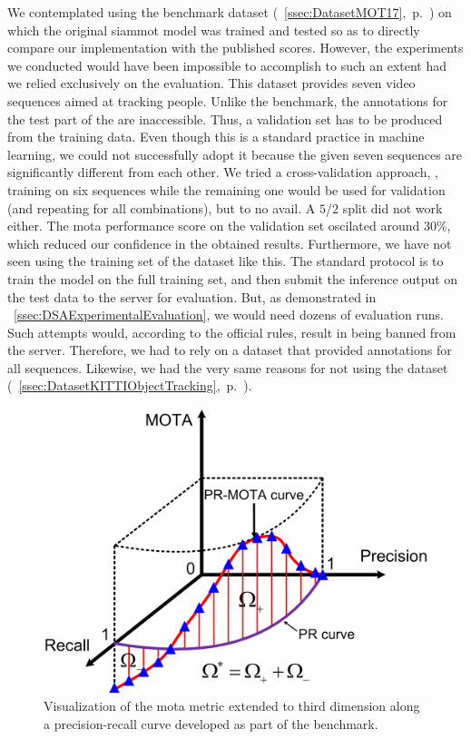 We contemplated using the \motseventeen{} benchmark dataset (\sectiontext{}~\ref{ssec:DatasetMOT17},~p.~\pageref{ssec:DatasetMOT17}) on which the original \gls{siammot} model was trained and tested so as to directly compare our implementation with the published scores. However, the experiments we conducted would have been impossible to accomplish to such an extent had we relied exclusively on the \motseventeen{} evaluation. This dataset provides seven video sequences aimed at tracking people. Unlike the \uadetrac{} benchmark, the annotations for the test part of the \motseventeen{} are inaccessible. Thus, a validation set has to be produced from the training data. Even though this is a standard practice in machine learning, we could not successfully adopt it because the given seven sequences are significantly different from each other. We tried a cross-validation approach, \ietext{}, training on six sequences while the remaining one would be used for validation (and repeating for all combinations), but to no avail. A $5$/$2$ split did not work either. The \gls{mota} performance score on the validation set oscilated around $30$\%, which reduced our confidence in the obtained results. Furthermore, we have not seen using the training set of the \motseventeen{} dataset like this. The standard protocol is to train the model on the full training set, and then submit the inference output on the test data to the server for evaluation. But, as demonstrated in \sectiontext{}~\ref{ssec:DSAExperimentalEvaluation}, we would need dozens of evaluation runs. Such attempts would, according to the official rules, result in being banned from the server. Therefore, we had to rely on a dataset that provided annotations for all sequences. Likewise, we had the very same reasons for not using the \kitti{} dataset (\sectiontext{}~\ref{ssec:DatasetKITTIObjectTracking},~p.~\pageref{ssec:DatasetKITTIObjectTracking}).

\begin{figure}[t]
    \centerline{\includegraphics[width=0.5\linewidth]{figures/siamese_tracking/pr_mota_curve.pdf}}
    \caption[Visualization of \gls{mota} along a precision-recall curve]{Visualization of the \gls{mota} metric extended to third dimension along a precision-recall curve developed as part of the \uadetrac{} benchmark. }
    \label{fig:PRMOTAVisualization}
\end{figure}

